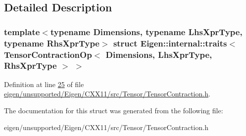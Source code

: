 \subsection{Detailed Description}
\subsubsection*{template$<$typename Dimensions, typename Lhs\+Xpr\+Type, typename Rhs\+Xpr\+Type$>$\newline
struct Eigen\+::internal\+::traits$<$ Tensor\+Contraction\+Op$<$ Dimensions, Lhs\+Xpr\+Type, Rhs\+Xpr\+Type $>$ $>$}



Definition at line \hyperlink{eigen_2unsupported_2_eigen_2_c_x_x11_2src_2_tensor_2_tensor_contraction_8h_source_l00025}{25} of file \hyperlink{eigen_2unsupported_2_eigen_2_c_x_x11_2src_2_tensor_2_tensor_contraction_8h_source}{eigen/unsupported/\+Eigen/\+C\+X\+X11/src/\+Tensor/\+Tensor\+Contraction.\+h}.



The documentation for this struct was generated from the following file\+:\begin{DoxyCompactItemize}
\item 
eigen/unsupported/\+Eigen/\+C\+X\+X11/src/\+Tensor/\+Tensor\+Contraction.\+h\end{DoxyCompactItemize}

